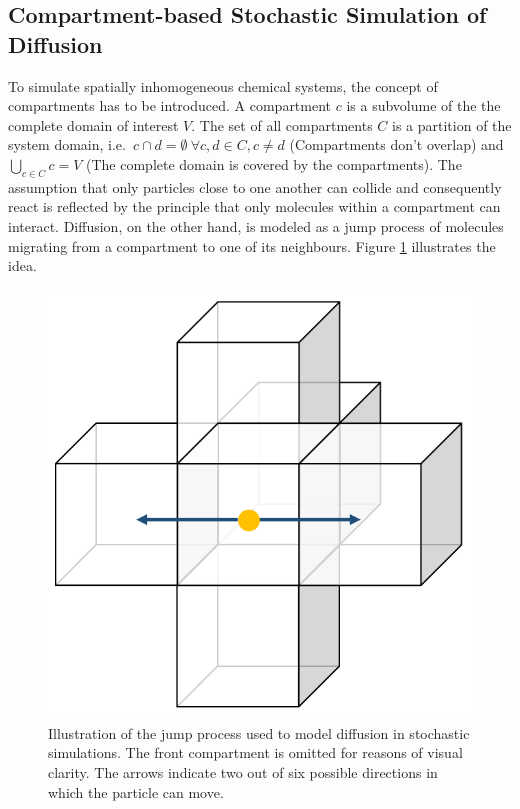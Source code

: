 \subsection{Compartment-based Stochastic Simulation of Diffusion}
\label{stochdiff}
To simulate spatially inhomogeneous chemical systems, the concept of compartments has to be introduced. A compartment $c$ is a subvolume of the the complete domain of interest $V$. The set of all compartments $C$ is a partition of the system domain, i.e.\ $c \cap d = \emptyset \:\forall c,d \in C, c \ne d$ (Compartments don't overlap) and $\bigcup_{c \in C} c = V$ (The complete domain is covered by the compartments). The assumption that only particles close to one another can collide and consequently react is reflected by the principle that only molecules within a compartment can interact. Diffusion, on the other hand, is modeled as a jump process of molecules migrating from a compartment to one of its neighbours. Figure \ref{fig:jumpprocess} illustrates the idea. 

\begin{figure}
\centering
\includegraphics[width=\textwidth]{images/jumpprocess.pdf}
\caption{Illustration of the jump process used to model diffusion in stochastic simulations. The front compartment is omitted for reasons of visual clarity. The arrows indicate two out of six possible directions in which the particle can move. }
\label{fig:jumpprocess}
\end{figure}

